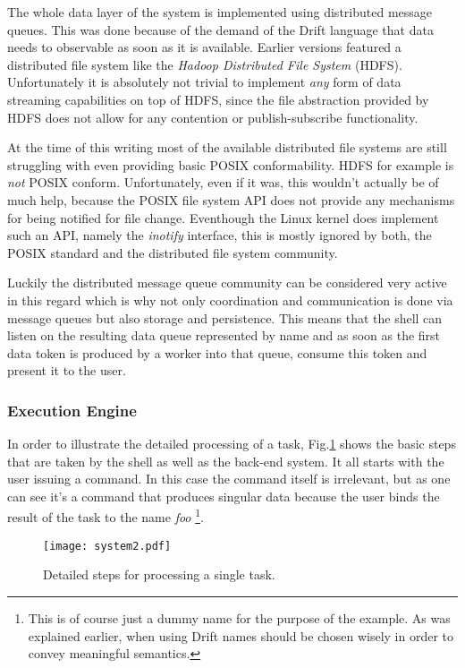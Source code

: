 The whole data layer of the system is implemented using distributed
message queues. This was done because of the demand of the Drift
language that data needs to observable as soon as it is available.
Earlier versions featured a distributed file system like the
\textit{Hadoop Distributed File System} (HDFS). Unfortunately it
is absolutely not trivial to implement \textit{any} form of
data streaming capabilities on top of HDFS, since the file
abstraction provided by HDFS does not allow for any contention
or publish-subscribe functionality.

At the time of this writing most of the available distributed
file systems are still struggling with even providing basic
POSIX conformability. HDFS for example is \textit{not} POSIX
conform. Unfortunately, even if it was, this wouldn't actually be of
much help, because the POSIX file system API does not provide
any mechanisms for being notified for file change. Eventhough
the Linux kernel does implement such an API, namely the
\textit{inotify} interface, this is mostly ignored by both,
the POSIX standard and the distributed file system community.

Luckily the distributed message queue community can be considered
very active in this regard which is why not only coordination
and communication is done via message queues but also storage
and persistence. This means that the shell can listen on the
resulting data queue represented by name and as soon as the first
data token is produced by a worker into that queue, consume this
token and present it to the user.

\subsubsection{Execution Engine}
\label{distributedexecution}

In order to illustrate the detailed processing of a task,
Fig.\ref{system2} shows the basic steps that are taken by the
shell as well as the back-end system.
It all starts with the user issuing a command. In this case
the command itself is irrelevant, but as one can see it's a
command that produces singular data because the user binds
the result of the task to the name \textit{foo} \footnote{This is of
course just a dummy name for the purpose of the example. As was
explained earlier, when using Drift names should be chosen wisely
in order to convey meaningful semantics.}.

\begin{figure}[h]
  \texttt{[image: system2.pdf]}
  \caption{Detailed steps for processing a single task.}
  \label{system2}
\end{figure}

